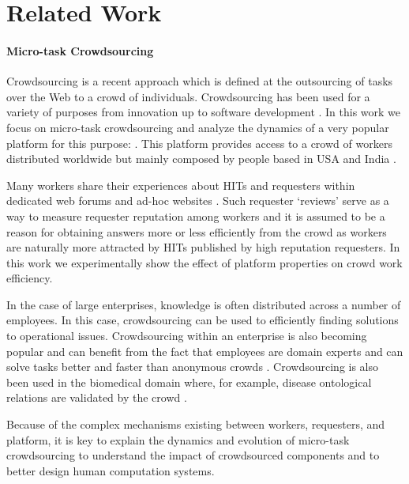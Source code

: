 \section{Related Work}\label{sec:relwork}

\paragraph{Micro-task Crowdsourcing}
Crowdsourcing is a recent approach which is defined at the  outsourcing of tasks over the Web to a crowd of individuals. Crowdsourcing has  been used for a variety of purposes from innovation up to software development \cite{platforms}.
% 
In this work we focus on micro-task crowdsourcing and analyze the dynamics of a  very popular  platform for this purpose: \amt{}. This platform provides access to a crowd of workers distributed worldwide but mainly composed by people based in USA and India \cite{mturk}.

Many \amt{} workers share their experiences about HITs and requesters within dedicated web forums and ad-hoc websites \cite{turkopticon}. Such requester `reviews' serve as a way to measure requester reputation among workers and it is assumed to be a reason for obtaining answers more or less efficiently from the crowd \cite{TOreputation} as workers are naturally more attracted by HITs published by high reputation requesters.
% 
In this work we experimentally show the effect of  platform  properties on crowd work efficiency.

In the case of large enterprises,  knowledge is often distributed across a number of employees. In this case, crowdsourcing can be used to efficiently finding solutions to operational issues. Crowdsourcing within an enterprise is also becoming popular and can benefit from the fact that employees are domain experts and can solve tasks better and faster than anonymous crowds  \cite{enterprisecrowdsourcing}. 
% 
Crowdsourcing is also been used in the biomedical domain where, for example, disease ontological relations are validated by the crowd \cite{bioonto,biomedical}.

Because of the complex mechanisms existing between workers, requesters, and platform, it is key to explain the dynamics and evolution of micro-task crowdsourcing to understand  the impact of  crowdsourced components and to better design human computation systems.



